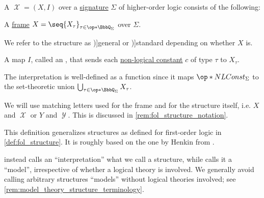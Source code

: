 \begin{definition}\label{def:hol_structure}\mimprovised
  A  \( \mscrX = (X, I) \) over a \hyperref[def:hol_signature]{signature} \( \Sigma \) of higher-order logic consists of the following:
  \begin{thmenum}
     A \hyperref[def:hol_frame]{frame} \( X = \seq{ X_\tau }_{\tau \in \op*{\BbbQ_\Sigma}} \) over \( \Sigma \).

    We refer to the structure as \term[en=general model (\cite[84]{Henkin1950CompletenessInTheoryOfTypes})]{general} or \term[en=standard model (\cite[83]{Henkin1950CompletenessInTheoryOfTypes})]{standard} depending on whether \( X \) is.

     A map \( I \), called an , that sends each \hyperref[def:hol_signature/nl_const]{non-logical constant} \( c \) of type \( \tau \) to \( X_\tau \).
  \end{thmenum}
\end{definition}
\begin{comments}
  \item The interpretation is well-defined as a function since it maps \( \op*{NLConst}_\Sigma \) to the set-theoretic union \( \bigcup_{\tau \in \op*{\BbbQ_\Sigma}} X_\tau \).

  \item We will use matching letters used for the frame and for the structure itself, i.e. \( X \) and \( \mscrX \) or \( Y \) and \( \mscrY \). This is discussed in \cref{rem:fol_structure_notation}.

  \item This definition generalizes structures as defined for first-order logic in \cref{def:fol_structure}. It is roughly based on the one by Henkin from \cite[83]{Henkin1950CompletenessInTheoryOfTypes}.

  \textcite[238]{Andrews2002Logic} instead calls an \enquote{interpretation} what we call a structure, while \textcite[271]{Farmer2008STTVirtues} calls it a \enquote{model}, irrespective of whether a logical theory is involved. We generally avoid calling arbitrary structures \enquote{models} without logical theories involved; see \cref{rem:model_theory_structure_terminology}.
\end{comments}

